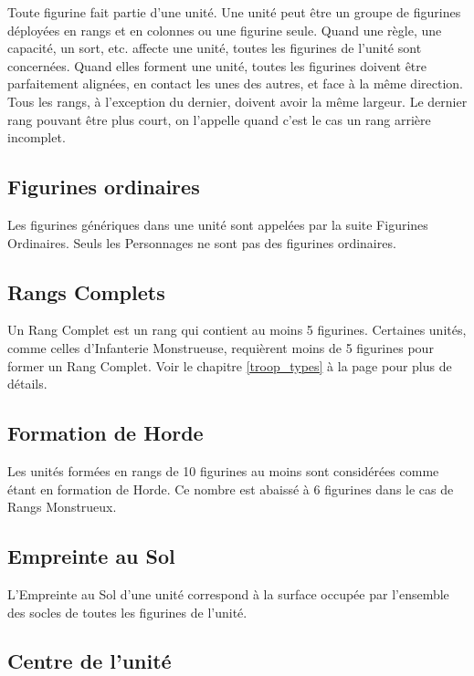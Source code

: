 Toute figurine fait partie d'une unité. Une unité peut être un groupe de figurines déployées en rangs et en colonnes ou une figurine seule. Quand une règle, une capacité, un sort, etc. affecte une unité, toutes les figurines de l'unité sont concernées. Quand elles forment une unité, toutes les figurines doivent être parfaitement alignées, en contact les unes des autres, et face à la même direction. Tous les rangs, à l'exception du dernier, doivent avoir la même largeur. Le dernier rang pouvant être plus court, on l'appelle quand c'est le cas un rang arrière incomplet. 

\subsection{Figurines ordinaires}

Les figurines génériques dans une unité sont appelées par la suite Figurines Ordinaires. Seuls les Personnages ne sont pas des figurines ordinaires.

\subsection{Rangs Complets}

Un Rang Complet est un rang qui contient au moins 5 figurines. Certaines unités, comme celles d'Infanterie Monstrueuse, requièrent moins de 5 figurines pour former un Rang Complet. Voir le chapitre \ref{troop_types} à la page \pageref{troop_types} pour plus de détails.

\subsection{Formation de Horde}
\label{horde}

Les unités formées en rangs de 10 figurines au moins sont considérées comme étant en formation de Horde. Ce nombre est abaissé à 6 figurines dans le cas de Rangs Monstrueux.

\subsection{Empreinte au Sol}

L'Empreinte au Sol d'une unité correspond à la surface occupée par l'ensemble des socles de toutes les figurines de l'unité.

\subsection{Centre de l'unité}
\label{centre_unite}


